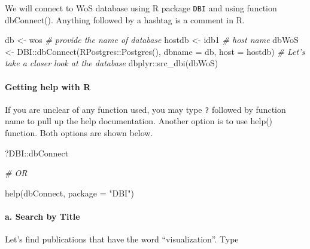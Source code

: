 \documentclass[
]{article}
\newenvironment{Shaded}{\begin{snugshade}}{\end{snugshade}}
\newcommand{\AttributeTok}[1]{\textcolor[rgb]{0.77,0.63,0.00}{#1}}
\newcommand{\CommentTok}[1]{\textcolor[rgb]{0.56,0.35,0.01}{\textit{#1}}}
\newcommand{\FunctionTok}[1]{\textcolor[rgb]{0.00,0.00,0.00}{#1}}
\newcommand{\NormalTok}[1]{#1}
\newcommand{\OtherTok}[1]{\textcolor[rgb]{0.56,0.35,0.01}{#1}}
\newcommand{\SpecialCharTok}[1]{\textcolor[rgb]{0.00,0.00,0.00}{#1}}
\newcommand{\StringTok}[1]{\textcolor[rgb]{0.31,0.60,0.02}{#1}}
\begin{document}
We will connect to WoS database using R package \texttt{DBI} and using
function dbConnect(). Anything followed by a hashtag is a comment in R.

\begin{Shaded}
\begin{Highlighting}[]
\NormalTok{db }\OtherTok{\textless{}{-}} \StringTok{\textquotesingle{}wos\textquotesingle{}}  \CommentTok{\# provide the name of database}
\NormalTok{hostdb }\OtherTok{\textless{}{-}} \StringTok{\textquotesingle{}idb1\textquotesingle{}} \CommentTok{\# host name}
\NormalTok{dbWoS }\OtherTok{\textless{}{-}}\NormalTok{ DBI}\SpecialCharTok{::}\FunctionTok{dbConnect}\NormalTok{(RPostgres}\SpecialCharTok{::}\FunctionTok{Postgres}\NormalTok{(), }
                 \AttributeTok{dbname =}\NormalTok{ db, }
                 \AttributeTok{host =}\NormalTok{ hostdb)  }
\CommentTok{\# Let’s take a closer look at the database}
\NormalTok{dbplyr}\SpecialCharTok{::}\FunctionTok{src\_dbi}\NormalTok{(dbWoS)}
\end{Highlighting}
\end{Shaded}

\hypertarget{getting-help-with-r}{%
\paragraph{Getting help with R}\label{getting-help-with-r}}

If you are unclear of any function used, you may type \texttt{?}
followed by function name to pull up the help documentation. Another
option is to use help() function. Both options are shown below.

\begin{Shaded}
\begin{Highlighting}[]
\NormalTok{?DBI}\SpecialCharTok{::}\NormalTok{dbConnect}

\CommentTok{\# OR}

\FunctionTok{help}\NormalTok{(dbConnect, }\AttributeTok{package =} \StringTok{"DBI"}\NormalTok{)}
\end{Highlighting}
\end{Shaded}

\hypertarget{a.-search-by-title}{%
\paragraph{a. Search by Title}\label{a.-search-by-title}}

Let's find publications that have the word ``visualization''. Type
\end{document}
